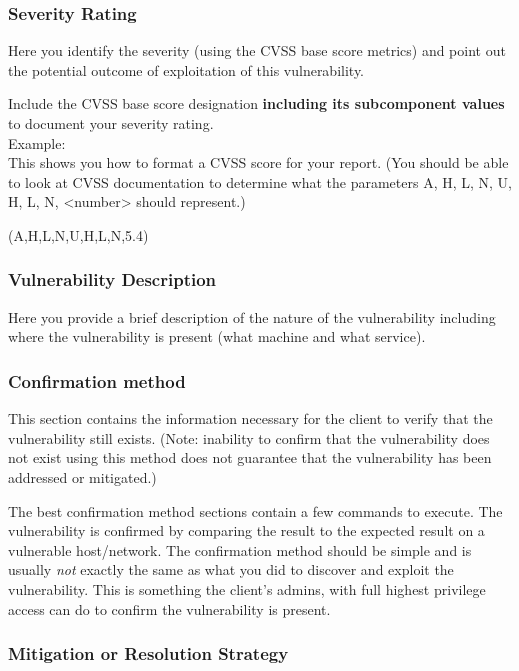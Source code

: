 	\subsubsection*{Severity Rating}
		Here you identify the severity (using the CVSS base score metrics)
		and point out the potential outcome of exploitation of this
		vulnerability.

		Include the CVSS base score designation \textbf{including its
		subcomponent values} to document your	severity rating.\\
		Example: \\
	   	This shows you how to format a CVSS score for your report.
	   	(You should be able to look at CVSS documentation to
	   	determine what the parameters A, H, L, N, U, H, L, N,
	   	<number> should represent.)
	   	
	    
		\cvss(A,H,L,N,U,H,L,N,5.4)
		
  	\subsubsection*{Vulnerability Description}
  		Here you provide a brief description of the nature of the vulnerability
  		including where the vulnerability is present (what machine and
  		what service).
  		
  	\subsubsection*{Confirmation method}
  	
		This section contains the information necessary for the
		client to verify that the vulnerability still exists.
		(Note: inability to confirm that the vulnerability
		does not exist using this method does not
		guarantee that the vulnerability has been addressed
		or mitigated.)
		
		The best confirmation method sections contain a few commands
		to execute. The vulnerability is confirmed by comparing
		the result to the expected result on a vulnerable
		host/network. The confirmation method should be simple
		and is usually \emph{not} exactly the same as what you
		did to discover and exploit the vulnerability.
		This is something the client's admins, with full
		highest privilege access can do to confirm the
		vulnerability is present.
		
    \subsubsection*{Mitigation or Resolution Strategy}
    
